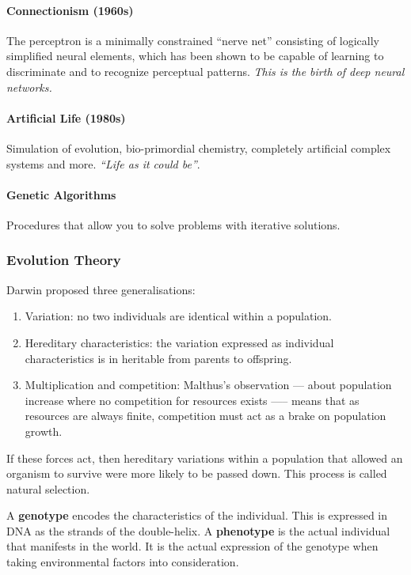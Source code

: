 \paragraph{Connectionism (1960s)} The perceptron is a minimally constrained ``nerve net'' consisting of logically simplified neural elements, which has been shown to be capable of learning to discriminate and to recognize perceptual patterns. \textit{This is the birth of deep neural networks.}

\paragraph{Artificial Life (1980s)} Simulation of evolution, bio-primordial chemistry, completely artificial complex systems and more. \textit{``Life as it could be''}.

\paragraph{Genetic Algorithms} Procedures that allow you to solve problems with iterative solutions.

\subsubsection{Evolution Theory}

Darwin proposed three generalisations:

\begin{enumerate}
    \item Variation: no two individuals are identical within a population.
    \item Hereditary characteristics: the variation expressed as individual characteristics is in heritable from parents to offspring.
    \item Multiplication and competition: Malthus’s observation --- about population increase where no competition for resources exists —-- means that as resources are always finite, competition must act as a brake on population growth.
\end{enumerate}

If these forces act, then hereditary variations within a population that allowed an organism to survive were more likely to be passed down. This process is called natural selection.

A \textbf{genotype} encodes the characteristics of the individual. This is expressed in DNA as the strands of the double-helix. A \textbf{phenotype} is the actual individual that manifests in the world. It is the actual expression of the genotype when taking environmental factors into consideration.

